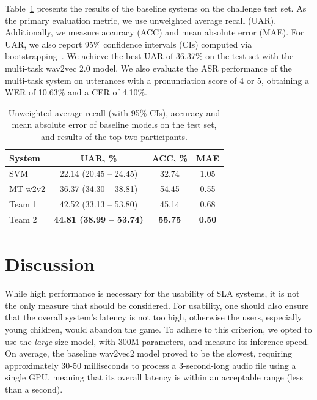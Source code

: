 \documentclass{article}
\begin{document}
Table~\ref{tab:res_baselines} presents the results of the baseline systems on the challenge test set. As the primary evaluation metric, we use unweighted average recall (UAR). Additionally, we measure accuracy (ACC) and mean absolute error (MAE).
For UAR, we also report 95\% confidence intervals (CIs) computed via bootstrapping~\cite{CI}. We achieve the best UAR of 36.37\% on the test set with the multi-task wav2vec 2.0 model. We also evaluate the ASR performance of the multi-task system on utterances with a pronunciation score of 4 or 5, obtaining a WER of 10.63\% and a CER of 4.10\%.

\begin{table}
    \centering
      \begin{tabular}{lccc}
         \toprule
       \textbf{System} & \textbf{UAR, \%} & \textbf{ACC, \%} & \textbf{MAE} \\
       \hline
         SVM & 22.14 (20.45 -- 24.45) & 32.74 & 1.05 \\
         MT w2v2 & 36.37 (34.30 -- 38.81) & 54.45 & 0.55 \\
         \hline
         \hline
         Team 1 & 42.52 (33.13 -- 53.80) & 45.14 & 0.68 \\
         Team 2 & \textbf{44.81 (38.99 -- 53.74)} & \textbf{55.75} & \textbf{0.50}\\
         \bottomrule
      \end{tabular}
    \caption{Unweighted average recall (with 95\% CIs), accuracy and mean absolute error of baseline models on the test set, and results of the top two participants.}
    \label{tab:res_baselines}
\end{table}

\section{Discussion}
\label{sec:discuss}

While high performance is necessary for the usability of SLA systems, it is not the only measure that should be considered. For usability, one should also ensure that the overall system's latency is not too high, otherwise the users, especially young children, would abandon the game. To adhere to this criterion, we opted to use the \textit{large} size model, with 300M parameters, and measure its inference speed. On average, the baseline wav2vec2 model proved to be the slowest, requiring approximately 30-50 milliseconds to process a 3-second-long audio file using a single GPU, meaning that its overall latency is within an acceptable range (less than a second).
\end{document}

